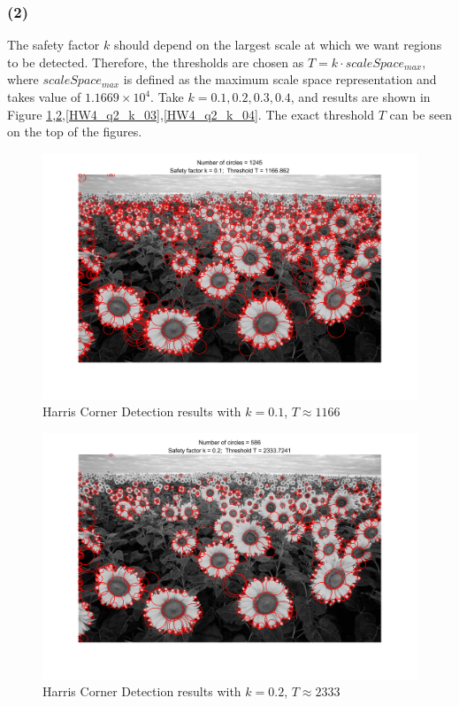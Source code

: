 \documentclass[letterpaper]{article}
\begin{document}
\subsubsection*{(2)}
The safety factor $k$ should depend on the largest scale at which we want regions to be detected. Therefore, the thresholds are chosen as $T = k\cdot scaleSpace_{max}$, where $scaleSpace_{max}$ is defined as the maximum scale space representation and takes value of $1.1669\times 10^4$. Take $k = 0.1, 0.2, 0.3, 0.4$, and results are shown in Figure \ref{HW4_q2_k_01},\ref{HW4_q2_k_02},\ref{HW4_q2_k_03},\ref{HW4_q2_k_04}. The exact threshold $T$ can be seen on the top of the figures.\\
\begin{figure}[H]
\begin{center}
\includegraphics[width = 14cm]{HW4_q2_k_01.jpeg}
\end{center}
\caption{Harris Corner Detection results with $k=0.1$, $T\approx 1166$}
\label{HW4_q2_k_01}
\end{figure}

\begin{figure}[H]
\begin{center}
\includegraphics[width = 14cm]{HW4_q2_k_02.jpeg}
\end{center}
\caption{Harris Corner Detection results with $k=0.2$, $T\approx 2333$}
\label{HW4_q2_k_02}
\end{figure}
\end{document}
